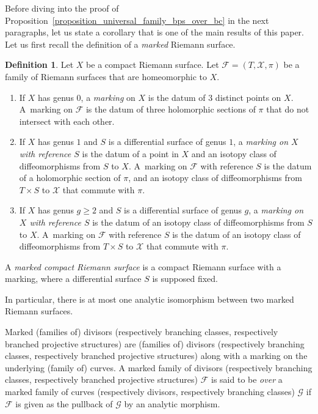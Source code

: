 \documentclass[10pt]{amsart}
\theoremstyle{definition}
\newtheorem{definition}{Definition}[subsection]
\theoremstyle{plain}
\begin{document}
Before diving into the proof of Proposition~\ref{proposition_universal_family_bps_over_bc} in the next paragraphs, let us state a corollary that is one of the main results of this paper.
Let us first recall the definition of a \emph{marked} Riemann surface.

\begin{definition}
Let $X$ be a compact Riemann surface.
Let $\mathcal F = (T, \mathcal X, \pi)$ be a family of Riemann surfaces that are homeomorphic to $X$.
\begin{enumerate}
\item
If $X$ has genus $0$, a \emph{marking} on $X$ is the datum of $3$ distinct points on $X$.
A~marking on $\mathcal F$ is the datum of three holomorphic sections of $\pi$ that do not intersect with each other.
\item
If $X$ has genus $1$ and $S$ is a differential surface of genus $1$, a \emph{marking on $X$ with reference $S$} is the datum of a point in $X$ and an isotopy class of diffeomorphisms from $S$ to $X$.
A~marking on $\mathcal F$ with reference $S$ is the datum of a holomorphic section of $\pi$, and an isotopy class of diffeomorphisms from $T \times S$ to $\mathcal X$ that commute with $\pi$.
\item
If $X$ has genus $g \ge 2$ and $S$ is a differential surface of genus $g$, a \emph{marking on~$X$ with reference $S$} is the datum of an isotopy class of diffeomorphisms from $S$ to $X$.
A~marking on $\mathcal F$ with reference $S$ is the datum of an isotopy class of diffeomorphisms from $T \times S$ to $\mathcal X$ that commute with $\pi$.
\end{enumerate}

A \emph{marked compact Riemann surface} is a compact Riemann surface with a marking, where a differential surface $S$ is supposed fixed.
\end{definition}

In particular, there is at most one analytic isomorphism between two marked Riemann surfaces.

Marked (families of) divisors (respectively branching classes, respectively branched projective structures) are (families of) divisors (respectively branching classes, respectively branched projective structures) along with a marking on the underlying (family of) curves.
A marked family of divisors (respectively branching classes, respectively branched projective structures) $\mathcal F$ is said to be \emph{over} a marked family of curves (respectively divisors, respectively branching classes) $\mathcal G$ if $\mathcal F$ is given as the pullback of $\mathcal G$ by an analytic morphism.
\end{document}
